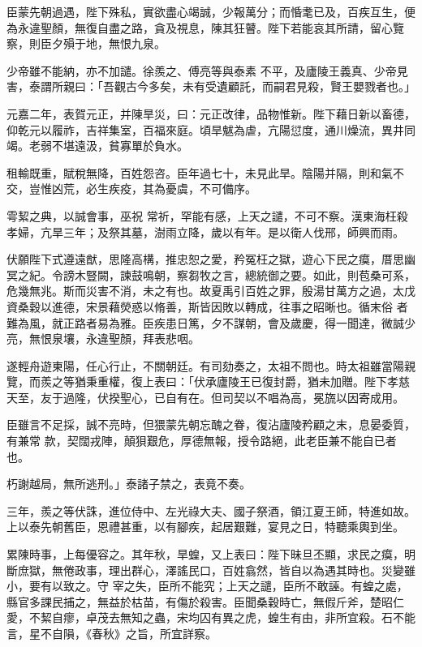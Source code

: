\begin{pinyinscope}
 臣蒙先朝過遇，陛下殊私，實欲盡心竭誠，少報萬分；而惛耄已及，百疾互生，便為永違聖顏，無復自盡之路，貪及視息，陳其狂瞽。陛下若能哀其所請，留心覽察，則臣夕殞于地，無恨九泉。



 少帝雖不能納，亦不加譴。徐羨之、傅亮等與泰素
 不平，及廬陵王義真、少帝見害，泰謂所親曰：「吾觀古今多矣，未有受遺顧託，而嗣君見殺，賢王嬰戮者也。」



 元嘉二年，表賀元正，并陳旱災，曰：元正改律，品物惟新。陛下藉日新以畜德，仰乾元以履祚，吉祥集室，百福來庭。頃旱魃為虐，亢陽愆度，通川燥流，異井同竭。老弱不堪遠汲，貧寡單於負水。



 租輸既重，賦稅無降，百姓怨咨。臣年過七十，未見此旱。陰陽并隔，則和氣不交，豈惟凶荒，必生疾疫，其為憂虞，不可備序。



 雩絜之典，以誠會事，巫祝
 常祈，罕能有感，上天之譴，不可不察。漢東海枉殺孝婦，亢旱三年；及祭其墓，澍雨立降，歲以有年。是以衛人伐邢，師興而雨。



 伏願陛下式遵遠猷，思隆高構，推忠恕之愛，矜冤枉之獄，遊心下民之瘼，厝思幽冥之紀。令謗木豎闕，諫鼓鳴朝，察芻牧之言，總統御之要。如此，則苞桑可系，危幾無兆。斯而災害不消，未之有也。故夏禹引百姓之罪，殷湯甘萬方之過，太戊資桑穀以進德，宋景藉熒惑以脩善，斯皆因敗以轉成，往事之昭晰也。循末俗
 者難為風，就正路者易為雅。臣疾患日篤，夕不謀朝，會及歲慶，得一聞達，微誠少亮，無恨泉壤，永違聖顏，拜表悲咽。



 遂輕舟遊東陽，任心行止，不關朝廷。有司劾奏之，太祖不問也。時太祖雖當陽親覽，而羨之等猶秉重權，復上表曰：「伏承廬陵王已復封爵，猶未加贈。陛下孝慈天至，友于過隆，伏揆聖心，已自有在。但司契以不唱為高，冕旒以因寄成用。



 臣雖言不足採，誠不亮時，但猥蒙先朝忘醜之眷，復沾廬陵矜顧之末，息晏委質，有兼常
 款，契闊戎陣，顛狽艱危，厚德無報，授令路絕，此老臣兼不能自已者也。



 朽謝越局，無所逃刑。」泰諸子禁之，表竟不奏。



 三年，羨之等伏誅，進位侍中、左光祿大夫、國子祭酒，領江夏王師，特進如故。上以泰先朝舊臣，恩禮甚重，以有腳疾，起居艱難，宴見之日，特聽乘輿到坐。



 累陳時事，上每優容之。其年秋，旱蝗，又上表曰：陛下昧旦丕顯，求民之瘼，明斷庶獄，無倦政事，理出群心，澤謠民口，百姓翕然，皆自以為遇其時也。災變雖小，要有以致之。守
 宰之失，臣所不能究；上天之譴，臣所不敢誣。有蝗之處，縣官多課民捕之，無益於枯苗，有傷於殺害。臣聞桑穀時亡，無假斤斧，楚昭仁愛，不絜自瘳，卓茂去無知之蟲，宋均囚有異之虎，蝗生有由，非所宜殺。石不能言，星不自隕，《春秋》之旨，所宜詳察。




\end{pinyinscope}
